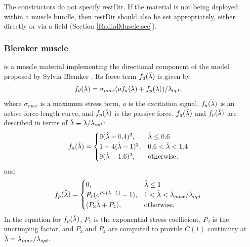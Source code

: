 The constructors do not specify {\sf restDir}. If the material is not
being deployed within a muscle bundle, then {\sf restDir} should also
be set appropriately, either directly or via a field
(Section \ref{RadialMuscle:sec}).

\subsubsection{Blemker muscle}
\label{BlemkerMuscle:sec}

is a muscle material implementing the directional component of the
model proposed by Sylvia Blemker \cite{blemker:2005:muscle}. Its force
term $f_d(\bar\lambda)$ is given by
%
\begin{equation}
f_d(\bar\lambda) = \sigma_{max} (a f_a(\bar\lambda) + f_p(\bar\lambda))/\bar\lambda_{opt},
\end{equation}
%
where $\sigma_{max}$ is a maximum stress term, $a$ is the excitation
signal, $f_a(\bar\lambda)$ is an active force-length curve, and $f_p(\bar\lambda)$ is
the passive force. $f_a(\bar\lambda)$ and $f_p(\bar\lambda)$ are described in
terms of $\hat\lambda \equiv \bar\lambda/\bar\lambda_{opt}$:
%
\begin{equation}
f_a(\hat\lambda) =
\begin{cases}
9 (\hat\lambda-0.4)^2, & \hat\lambda \le 0.6 \\
1 - 4 (\hat\lambda-1)^2, & 0.6 < \hat\lambda < 1.4\\
9 (\hat\lambda-1.6)^2, & \mathrm{otherwise},
\end{cases}
\end{equation}
%
and
%
\begin{equation}
f_p(\hat\lambda) =
\begin{cases}
0, & \hat\lambda \le 1 \\
P_1 (e^{P_2(\hat\lambda-1)}-1), & 1 < \hat\lambda < \bar\lambda_{max}/\bar\lambda_{opt} \\
(P_3 \hat\lambda + P_4), & \mathrm{otherwise}.
\end{cases}
\end{equation}
%
In the equation for $f_p(\bar\lambda)$, $P_1$ is the exponential stress
coefficient, $P_2$ is the uncrimping factor, and $P_3$ and $P_4$ are
computed to provide $C(1)$ continuity at $\hat\lambda = \bar\lambda_{max}/\bar\lambda_{opt}$.

